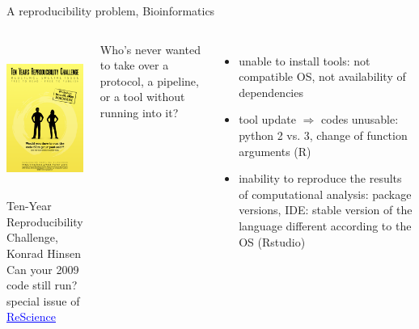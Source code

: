 \begin{frame}{A reproducibility problem, Bioinformatics}
\begin{columns}
   \begin{center}
\includegraphics[height=5cm]{01_introduction/images/FAIR_resciences_10-years-challenge.png}
\small{
Ten-Year Reproducibility\\
Challenge, Konrad Hinsen\\
Can your 2009 code still run? \\
special issue of \href{http://rescience.github.io/ten-years}{\textcolor{blue}{\underline{ReScience}}}
}
   \end{center}
Who's never wanted to take over a protocol, a pipeline, or a tool without running into it?
\begin{itemize}
    \item unable to install tools: not compatible OS, not availability of dependencies
    \item tool update $\Rightarrow$ codes unusable: python 2 vs. 3, change of function arguments (R)
    \item inability to reproduce the results of computational analysis: package versions, IDE: stable version of the language different according to the OS (Rstudio)
\end{itemize}
\end{columns}
\end{frame}
